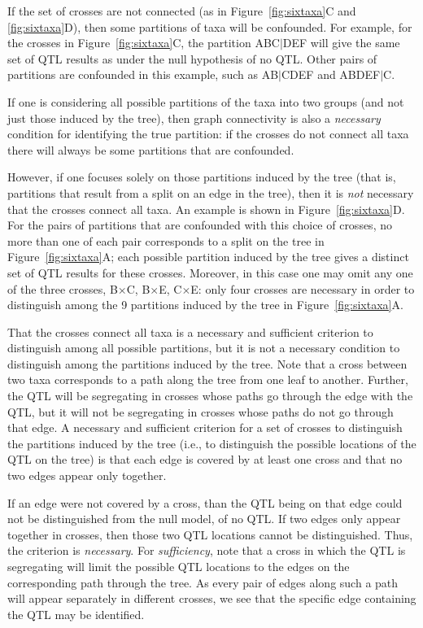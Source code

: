 \documentclass[12pt,letterpaper]{article}
\begin{document}
If the set of crosses are not connected (as in Figure~\ref{fig:sixtaxa}C
and \ref{fig:sixtaxa}D), then some partitions of taxa will be
confounded.  For example, for the crosses in Figure~\ref{fig:sixtaxa}C,
the partition ABC$|$DEF will give the same set of QTL results as under
the null hypothesis of no QTL.  Other pairs of partitions are
confounded in this example, such as AB$|$CDEF and ABDEF$|$C.

If one is considering all possible
partitions of the taxa into two groups (and not just those induced by
the tree), then graph connectivity is also a \emph{necessary\/} condition for
identifying the true partition:
if the crosses do not connect all taxa there will always be
some partitions that are confounded.  

However, if one focuses solely on those partitions induced by the tree
(that is, partitions that result from a split on an edge in the tree),
then it is \emph{not\/} necessary that the crosses connect all taxa.
An example is shown in Figure~\ref{fig:sixtaxa}D.  For the pairs of
partitions that are confounded with this choice of crosses, no more
than one of each pair corresponds to a split on the tree in
Figure~\ref{fig:sixtaxa}A; each possible partition induced by the tree
gives a distinct set of QTL results for these crosses.  
Moreover, in this case one may omit any one of the three
crosses, B$\times$C, B$\times$E, C$\times$E: only four crosses are
necessary in order to distinguish among the 9 partitions induced by
the tree in Figure~\ref{fig:sixtaxa}A.

That the crosses connect all taxa is a necessary and
sufficient criterion to distinguish among all possible partitions,
but it is not a necessary condition to distinguish among the partitions induced
by the tree.  Note that a cross between two taxa corresponds to a path
along the tree from one leaf to another. Further, the QTL will be
segregating in crosses whose paths go through
the edge with the QTL, but it will not be segregating in crosses whose
paths do not go through that edge.  A necessary and sufficient
criterion for a set of crosses to distinguish the partitions induced
by the tree (i.e., to distinguish the possible locations of the QTL on
the tree) is that each edge is covered by at least one cross and that
no two edges appear only together.

If an edge were not covered by a
cross, than the QTL being on that edge could not be distinguished from
the null model, of no QTL.  If two edges only appear together in
crosses, then those two QTL locations cannot be distinguished.  Thus,
the criterion is \emph{necessary}.  For \emph{sufficiency}, note that
a cross in which the QTL is segregating will limit the possible QTL
locations to the edges on the corresponding path through the tree.
As every pair of edges along such a path will appear separately in
different crosses, we see that the specific edge containing the QTL
may be identified.
\end{document}
